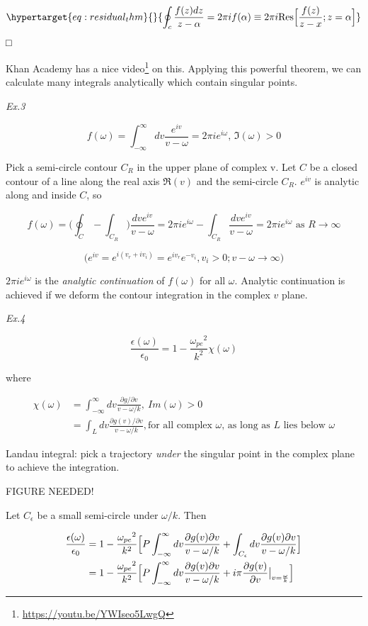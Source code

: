 \documentclass[
  notoc %
]{tufte-book}
\DeclareRobustCommand{\href}[2]{#2\footnote{\url{#1}}}
\begin{document}
\begin{equation}\protect\hypertarget{eq:residual_thm}{}{
\oint_c \frac{f(z)dz}{z-\alpha}=2\pi i f(\alpha)\equiv 2\pi i \text{Res}\Big[ \frac{f(z)}{z-x};z=\alpha \Big]
}\label{eq:residual_thm}\end{equation} □

Khan Academy has a \href{https://youtu.be/YWIseo5LwgQ}{nice video} on
this. Applying this powerful theorem, we can calculate many integrals
analytically which contain singular points.

\emph{Ex.3}

\[
f(\omega)=\int_{-\infty}^{\infty}dv \frac{e^{iv}}{v-\omega}=2\pi ie^{i\omega},\,\Im(\omega)>0
\]

Pick a semi-circle contour \(C_R\) in the upper plane of complex v. Let
\(C\) be a closed contour of a line along the real axis \(\Re(v)\) and
the semi-circle \(C_R\). \(e^{iv}\) is analytic along and inside \(C\),
so

\[
f(\omega)=\Big(\oint_C-\int_{C_R}\Big)\frac{dv e^{iv}}{v-\omega}=2\pi i e^{i\omega}-\int_{C_R}\frac{dv e^{iv}}{v-\omega}=2\pi i e^{i\omega} \textrm{ as } R\rightarrow \infty
\]

\[
\Big( e^{iv}=e^{i(v_r+iv_i)}=e^{iv_r}e^{-v_i},v_i>0 ; v-\omega\rightarrow\infty\Big)
\]

\(2\pi ie^{i\omega}\) is the \emph{analytic continuation} of
\(f(\omega)\) for all \(\omega\). Analytic continuation is achieved if
we deform the contour integration in the complex \(v\) plane.

\emph{Ex.4}

\[
\frac{\epsilon(\omega)}{\epsilon_0}=1-\frac{{\omega_{pe}}^2}{k^2}\chi(\omega)
\]

where

\[
\begin{aligned}
\chi(\omega)&=\int_{-\infty}^{\infty}dv \frac{\partial g/\partial v}{v-\omega/k},\ Im(\omega)>0 \\
&=\int_L dv\frac{\partial g(v)/\partial v}{v-\omega/k}, \textrm{for all complex $\omega$, as long as $L$ lies below $\omega$}
\end{aligned}
\]

Landau integral: pick a trajectory \emph{under} the singular point in
the complex plane to achieve the integration.

FIGURE NEEDED!

Let \(C_\epsilon\) be a small semi-circle under \(\omega/k\). Then

\[
\begin{aligned}
\frac{\epsilon(\omega)}{\epsilon_0}&=1-\frac{{\omega_{pe}}^2}{k^2}\Big[  P\int_{-\infty}^{\infty}dv\frac{\partial g(v)\partial v}{v-\omega/k}+\int_{C_\epsilon}dv\frac{\partial g(v)\partial v}{v-\omega/k} \Big] \notag \\
&=1-\frac{{\omega_{pe}}^2}{k^2}\Big[  P\int_{-\infty}^{\infty}dv\frac{\partial g(v)\partial v}{v-\omega/k}+i\pi\frac{\partial g(v)}{\partial v}\big|_{v=\frac{\omega}{k}} \Big]
\end{aligned}
\]
\end{document}
